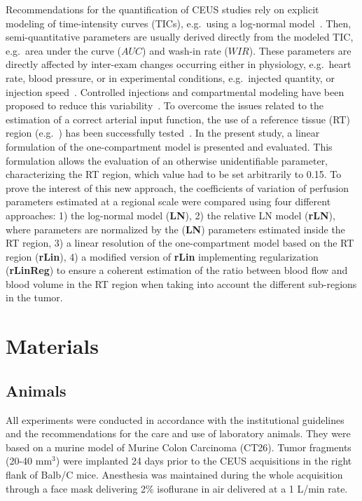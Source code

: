 Recommendations for the quantification of CEUS studies rely on explicit modeling of time-intensity curves (TICs), e.g.~using a log-normal model~\cite{Dietrich:2012kw}. 
Then, semi-quantitative parameters are usually derived directly from the modeled TIC, e.g.~area under the curve ($AUC$) and wash-in rate ($WIR$). 
These parameters are directly affected by inter-exam changes occurring either in physiology, e.g.~heart rate, blood pressure, or in experimental conditions, e.g.~injected quantity, or injection speed~\cite{Tang:2011fja}.
Controlled injections and compartmental modeling have been proposed to reduce this variability~\cite{Doury:2017fz}. To overcome the issues related to the estimation of a correct arterial input function, the use of a reference tissue (RT) region (e.g.~\cite{CardenasRodriguez:2013em}) has been successfully tested~\cite{Doury:2017fz}. 
In the present study, a linear formulation of the one-compartment model is presented and evaluated. This formulation allows the evaluation of an otherwise unidentifiable parameter, characterizing the RT region, which value had to be set arbitrarily to 0.15. To prove the interest of this new approach, the coefficients of variation of perfusion parameters estimated at a regional scale were compared using four different approaches: 1) the log-normal model (\textbf{LN}), 2) the relative LN model (\textbf{rLN}), where parameters are normalized by the (\textbf{LN}) parameters estimated inside the RT region, 3) a linear resolution of the one-compartment model based on the RT region (\textbf{rLin}), 4) a modified version of \textbf{rLin} implementing  regularization (\textbf{rLinReg}) to ensure a coherent estimation of the ratio between blood flow and blood volume in the RT region when taking into account the different sub-regions in the tumor.


\section{Materials}
\subsection{Animals}
All experiments were conducted in accordance with the institutional guidelines and the recommendations for the care and use of laboratory animals. They were based on a murine model of Murine Colon Carcinoma (CT26). Tumor fragments (20-40 mm$^3$) were implanted 24 days prior to the CEUS acquisitions in the right flank of Balb/C mice. Anesthesia was maintained during the whole acquisition through a face mask delivering 2\% isoflurane in air delivered at a 1 L/min rate. 

